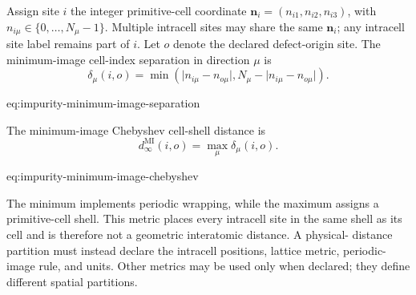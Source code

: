 Assign site $i$ the integer primitive-cell coordinate
$\mathbf n_i=(n_{i1},n_{i2},n_{i3})$, with
$n_{i\mu}\in\{0,\ldots,N_{\mu}-1\}$. Multiple intracell sites may share the
same $\mathbf n_i$; any intracell site label remains part of $i$. Let $o$ denote
the declared defect-origin site. The minimum-image cell-index separation in
direction $\mu$ is
\begin{equation}
    \delta_{\mu}(i,o)
    =
    \min\left(
      \lvert n_{i\mu}-n_{o\mu}\rvert,
      N_{\mu}-\lvert n_{i\mu}-n_{o\mu}\rvert
    \right).
    \label{eq:impurity-minimum-image-separation}
\end{equation}
\begin{equationterms}{eq:impurity-minimum-image-separation}
\end{equationterms}
The minimum-image Chebyshev cell-shell distance is
\begin{equation}
    d_{\infty}^{\mathrm{MI}}(i,o)
    =
    \max_{\mu}\delta_{\mu}(i,o).
    \label{eq:impurity-minimum-image-chebyshev}
\end{equation}
\begin{equationterms}{eq:impurity-minimum-image-chebyshev}
\end{equationterms}
The minimum implements periodic wrapping, while the maximum assigns a
primitive-cell shell. This metric places every intracell site in the same shell
as its cell and is therefore not a geometric interatomic distance. A physical-
distance partition must instead declare the intracell positions, lattice
metric, periodic-image rule, and units. Other metrics may be used only when
declared; they define different spatial partitions.

